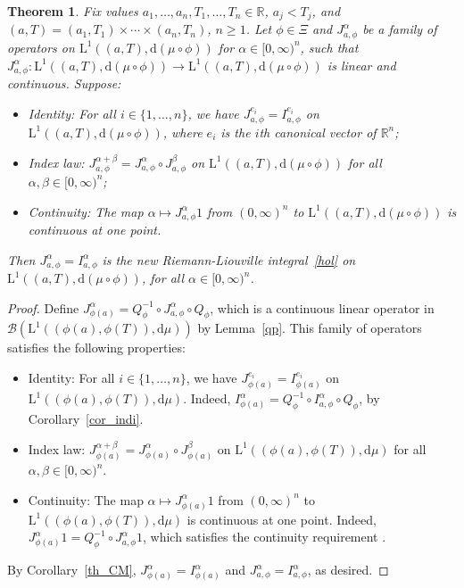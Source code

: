 \documentclass[12pt,reqno]{amsart}
\theoremstyle{plain}
\newtheorem{theorem}{Theorem}[section] %
\numberwithin{equation}{section} %
\begin{document}
\begin{theorem} \label{CartMc_several222}
Fix values $a_1,\ldots,a_n,T_1,\ldots,T_n\in \mathbb{R}$, $a_j<T_j$, and $(a,T)=(a_1,T_1)\times\cdots\times (a_n,T_n)$, $n\geq 1$. Let $\phi\in\Xi$ and $J_{a,\phi}^\alpha$ be a family of operators on $\mathrm{L}^1((a,T),\mathrm{d}(\mu\circ\phi))$ for $\alpha\in [0,\infty)^n$, such that $J_{a,\phi}^\alpha:\mathrm{L}^1((a,T),\mathrm{d}(\mu\circ\phi))\rightarrow \mathrm{L}^1((a,T),\mathrm{d}(\mu\circ\phi))$ is linear and continuous. Suppose: 
\begin{itemize}
\item Identity: For all $i\in\{1,\ldots,n\}$, we have $J_{a,\phi}^{e_i}=I_{a,\phi}^{e_i}$ on $\mathrm{L}^1((a,T),\mathrm{d}(\mu\circ\phi))$, where $e_i$ is the $i$th canonical vector of $\mathbb{R}^n$;
\item Index law: $J_{a,\phi}^{\alpha+\beta}=J_{a,\phi}^\alpha\circ J_{a,\phi}^\beta$ on $\mathrm{L}^1((a,T),\mathrm{d}(\mu\circ\phi))$ for all $\alpha,\beta\in [0,\infty)^n$; 
\item Continuity: The map $\alpha\mapsto J_{a,\phi}^{\alpha} 1$ from $(0,\infty)^n$ to $\mathrm{L}^1((a,T),\mathrm{d}(\mu\circ\phi))$ is continuous at one point.
\end{itemize}
Then $J_{a,\phi}^\alpha=I_{a,\phi}^\alpha$ is the new Riemann-Liouville integral~\eqref{hol} on $\mathrm{L}^1((a,T),\mathrm{d}(\mu\circ\phi))$, for all $\alpha\in [0,\infty)^n$.
\end{theorem}
\begin{proof}
Define $J_{\phi(a)}^\alpha=Q_{\phi}^{-1}\circ J_{a,\phi}^\alpha \circ Q_\phi$, which is a continuous linear operator in $\mathcal{B}(\mathrm{L}^1((\phi(a),\phi(T)),\mathrm{d}\mu))$ by Lemma~\ref{qp}. This family of operators satisfies the following properties:
\begin{itemize}
\item Identity: For all $i\in\{1,\ldots,n\}$, we have $J_{\phi(a)}^{e_i}=I_{\phi(a)}^{e_i}$ on $\mathrm{L}^1((\phi(a),\phi(T)),\mathrm{d}\mu)$. Indeed, $I_{\phi(a)}^\alpha=Q_{\phi}^{-1}\circ I_{a,\phi}^\alpha \circ Q_\phi$, by Corollary~\ref{cor_indi}.
\item Index law: $J_{\phi(a)}^{\alpha+\beta}=J_{\phi(a)}^\alpha\circ J_{\phi(a)}^\beta$ on $\mathrm{L}^1((\phi(a),\phi(T)),\mathrm{d}\mu)$ for all $\alpha,\beta\in [0,\infty)^n$.
\item Continuity: The map $\alpha\mapsto J_{\phi(a)}^{\alpha} 1$ from $(0,\infty)^n$ to $\mathrm{L}^1((\phi(a),\phi(T)),\mathrm{d}\mu)$ is continuous at one point. Indeed, $J_{\phi(a)}^{\alpha} 1=Q_{\phi}^{-1}\circ J_{a,\phi}^\alpha 1$, which satisfies the continuity requirement \cite[Lemma~1.5]{cao_jie}.
\end{itemize}
By Corollary~\ref{th_CM}, $J_{\phi(a)}^\alpha=I_{\phi(a)}^\alpha$ and $J_{a,\phi}^\alpha=I_{a,\phi}^\alpha$, as desired.
\end{proof}
\end{document}

